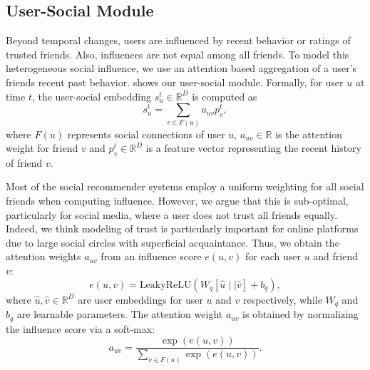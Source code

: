 \subsection{User-Social Module}
Beyond temporal changes, users are influenced by recent behavior or ratings of  trusted friends. Also, influences are not equal among all friends.
To model this heterogeneous social influence, we use an attention based aggregation of a user's friends recent past behavior.   shows our user-social module. Formally, for user $u$ at time $t$, the user-social embedding $s_u^{t} \in \mathbb{R}^D$ is computed as
\begin{equation}
  \label{eq:user}
  s_u^{t} = \sum_{v \in F(u)} a_{uv} p_v^t,
  \end{equation}
where $F(u)$ represents  social connections of user $u$, $a_{uv}\in\mathbb{R}$ is the attention weight for friend $v$ and $p_v^t \in \mathbb{R}^D$ is a feature vector representing the recent history of friend $v$.

Most of the social recommender systems \cite{SBPR, SERec, GBPR} employ a uniform weighting for all social friends when computing influence. However, we argue that this is sub-optimal, particularly for social media, where a user does not trust  all friends equally. Indeed, we think modeling of trust is particularly important for online platforms due to large social circles with  superficial acquaintance. Thus,
we obtain the attention weights $a_{uv}$ from an influence score $e(u, v)$ for each user $u$ and friend $v$:
\begin{equation}
  e(u,v) = \text{LeakyReLU}(W_q [\hat{u} \mid \mid \hat{v}] + b_q),
  \end{equation}
where $\hat{u}, \hat{v} \in \mathbb{R}^D$ are user embeddings for user $u$ and $v$ respectively, while $W_q$ and $b_q$ are learnable parameters. The  attention weight $a_{uv}$ is  obtained by normalizing the influence score via a soft-max:
\begin{equation}
  a_{uv} = \frac{\exp(e(u,v))} {\sum_{v \in F(u)} \exp(e(u,v))}.
  \end{equation}

